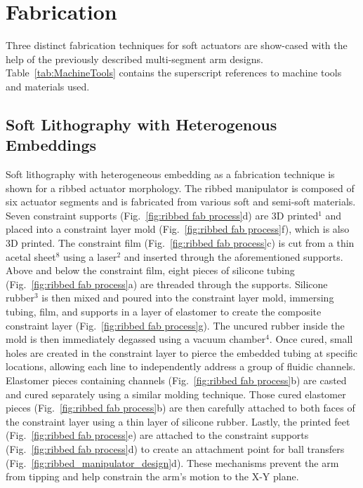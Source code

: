 \section{Fabrication}
\label{sec:Fabrication}
Three distinct fabrication techniques for soft actuators are show-cased with the help of the previously described multi-segment arm designs.
Table~\ref{tab:MachineTools} contains the superscript references to machine tools and materials used.

	
\subsection{Soft Lithography with Heterogenous Embeddings}
\label{subsec:Fabrication, Soft Lithography with Heterogenous Embeddings}
Soft lithography with heterogeneous embedding as a fabrication technique is shown for a ribbed actuator morphology. The ribbed manipulator is composed of six actuator segments and is fabricated from various soft and semi-soft materials.
Seven constraint supports (Fig.~\ref{fig:ribbed fab process}d) are 3D printed$^1$ and placed into a constraint layer mold (Fig.~\ref{fig:ribbed fab process}f), which is also 3D printed.
The constraint film (Fig.~\ref{fig:ribbed fab process}c) is cut from a thin acetal sheet$^8$ using a laser$^2$ and inserted through the aforementioned supports.
Above and below the constraint film, eight pieces of silicone tubing (Fig.~\ref{fig:ribbed fab process}a) are threaded through the supports.
Silicone rubber$^3$ is then mixed and poured into the constraint layer mold, immersing tubing, film, and supports in a layer of elastomer to create the composite constraint layer (Fig.~\ref{fig:ribbed fab process}g).
The uncured rubber inside the mold is then immediately degassed using a vacuum chamber$^4$.
Once cured, small holes are created in the constraint layer to pierce the embedded tubing at specific locations, allowing each line to independently address a group of fluidic channels.
Elastomer pieces containing channels (Fig.~\ref{fig:ribbed fab process}b) are casted and cured separately using a similar molding technique.
Those cured elastomer pieces (Fig.~\ref{fig:ribbed fab process}b) are then carefully attached to both faces of the constraint layer using a thin layer of silicone rubber.
Lastly, the printed feet (Fig.~\ref{fig:ribbed fab process}e) are attached to the constraint supports (Fig.~\ref{fig:ribbed fab process}d) to create an attachment point for ball transfers (Fig.~\ref{fig:ribbed_manipulator_design}d).
These mechanisms prevent the arm from tipping and help constrain the arm's motion to the X-Y plane.


